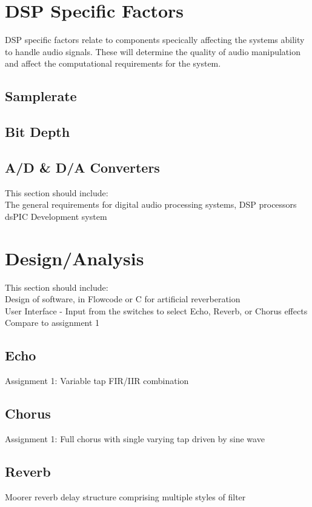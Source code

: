 \documentclass{scrartcl}
\begin{document}
    \section{DSP Specific Factors}
    DSP specific factors relate to components specically affecting the systems
    ability to handle audio signals. These will determine the quality of audio
    manipulation and affect the computational requirements for the system.

    \subsection{Samplerate}
    \subsection{Bit Depth}
    \subsection{A/D \& D/A Converters}



    This section should include:\\
        The general requirements for digital audio processing systems, DSP
        processors\\
        dsPIC Development system\\

    \section{Design/Analysis}
    This section should include:\\
        Design of software, in Flowcode or C for artificial reverberation\\
        User Interface - Input from the switches to select Echo, Reverb, or
        Chorus effects\\

        Compare to assignment 1\\
        \subsection{Echo}
        Assignment 1: Variable tap FIR/IIR combination
        \subsection{Chorus}
        Assignment 1: Full chorus with single varying tap driven by sine wave
        \subsection{Reverb}
        Moorer reverb delay structure comprising multiple styles of filter
\end{document}
